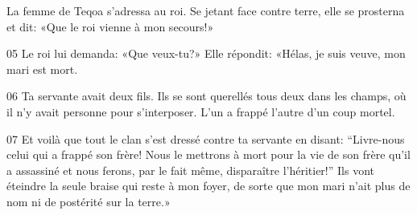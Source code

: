 La femme de Teqoa s’adressa au roi. Se jetant face contre terre, elle se prosterna et dit: «Que le roi vienne à mon secours!»

05 Le roi lui demanda: «Que veux-tu?» Elle répondit: «Hélas, je suis veuve, mon mari est mort.

06 Ta servante avait deux fils. Ils se sont querellés tous deux dans les champs, où il n’y avait personne pour s’interposer. L’un a frappé l’autre d’un coup mortel.

07 Et voilà que tout le clan s’est dressé contre ta servante en disant: “Livre-nous celui qui a frappé son frère! Nous le mettrons à mort pour la vie de son frère qu’il a assassiné et nous ferons, par le fait même, disparaître l’héritier!” Ils vont éteindre la seule braise qui reste à mon foyer, de sorte que mon mari n’ait plus de nom ni de postérité sur la terre.»
